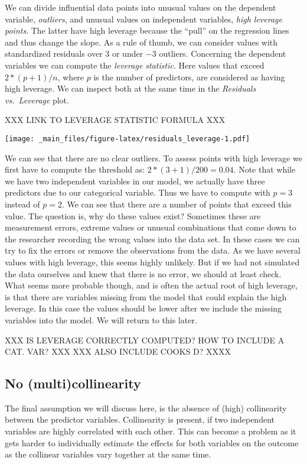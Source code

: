 \documentclass[
]{book}
\begin{document}
We can divide influential data points into unusual values on the dependent
variable, \emph{outliers}, and unusual values on independent variables,
\emph{high leverage points}. The latter have high leverage because the ``pull'' on the
regression lines and thus change the slope. As a rule of thumb, we can consider
values with standardized residuals over \(3\) or under \(-3\) outliers.
Concerning the dependent variables we can compute the \emph{leverage statistic}.
Here values that exceed \(2 * (p + 1) / n\), where \(p\) is the number of
predictors, are considered as having high leverage.
We can inspect both at the same time in the \emph{Residuals vs.~Leverage} plot.

XXX LINK TO LEVERAGE STATISTIC FORMULA XXX

\texttt{[image: \_main\_files/figure-latex/residuals\_leverage-1.pdf]}

We can see that there are no clear outliers. To assess points with high leverage
we first have to compute the threshold as: \(2 * (3 + 1) / 200 = 0.04\). Note that
while we have two independent variables in our model, we actually have three
predictors due to our categorical variable. Thus we have to compute with \(p = 3\)
instead of \(p = 2\).
We can
see that there are a number of points that exceed this value. The question is,
why do these values exist? Sometimes these are measurement errors, extreme values
or unusual combinations that come down to the researcher recording the wrong
values into the data set. In these cases we can try to fix the errors or remove
the observations from the data. As we have several values with high leverage,
this seems highly unlikely. But if we had not simulated the data ourselves and
knew that there is no error, we should at least check. What seems more probable
though, and is often the actual root of high leverage, is that there are
variables missing from the model that could explain the high leverage.
In this case the values should be lower after we include the missing
variables into the model. We will return to this later.

XXX IS LEVERAGE CORRECTLY COMPUTED? HOW TO INCLUDE A CAT. VAR? XXX
XXX ALSO INCLUDE COOKS D? XXXX

\hypertarget{no-multicollinearity}{%
\subsection{No (multi)collinearity}\label{no-multicollinearity}}

The final assumption we will discuss here, is the absence of (high) collinearity
between the predictor variables. Collinearity is present, if two independent
variables are highly correlated with each other. This can become a problem as it
gets harder to individually estimate the effects for both variables on the
outcome as the collinear variables vary together at the same time.
\end{document}
